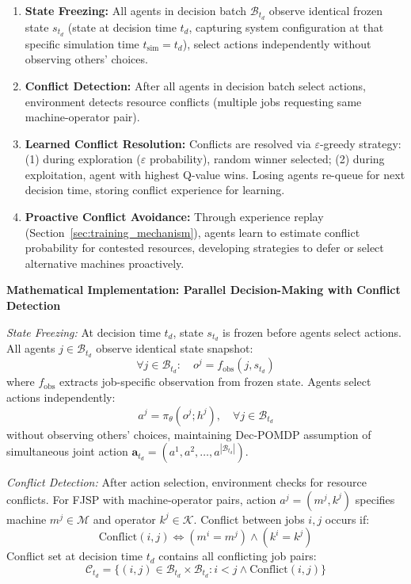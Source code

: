 \begin{enumerate}
\item \textbf{State Freezing:} All agents in decision batch \( \mathcal{B}_{t_d} \) observe identical frozen state \( s_{t_d} \) (state at decision time \( t_d \), capturing system configuration at that specific simulation time \( t_{\text{sim}} = t_d \)), select actions independently without observing others' choices.

\item \textbf{Conflict Detection:} After all agents in decision batch select actions, environment detects resource conflicts (multiple jobs requesting same machine-operator pair).

\item \textbf{Learned Conflict Resolution:} Conflicts are resolved via \( \varepsilon \)-greedy strategy: (1) during exploration (\( \varepsilon \) probability), random winner selected; (2) during exploitation, agent with highest Q-value wins. Losing agents re-queue for next decision time, storing conflict experience for learning.

\item \textbf{Proactive Conflict Avoidance:} Through experience replay (Section~\ref{sec:training_mechanism}), agents learn to estimate conflict probability for contested resources, developing strategies to defer or select alternative machines proactively.
\end{enumerate}

\textbf{Mathematical Implementation: Parallel Decision-Making with Conflict Detection}

\textit{State Freezing:} At decision time \( t_d \), state \( s_{t_d} \) is frozen before agents select actions. All agents \( j \in \mathcal{B}_{t_d} \) observe identical state snapshot:
\[
\forall j \in \mathcal{B}_{t_d}: \quad o^j = f_{\text{obs}}(j, s_{t_d})
\]
where \( f_{\text{obs}} \) extracts job-specific observation from frozen state. Agents select actions independently:
\[
a^j = \pi_{\theta}(o^j; h^j), \quad \forall j \in \mathcal{B}_{t_d}
\]
without observing others' choices, maintaining Dec-POMDP assumption of simultaneous joint action \( \mathbf{a}_{t_d} = (a^1, a^2, \ldots, a^{|\mathcal{B}_{t_d}|}) \).

\textit{Conflict Detection:} After action selection, environment checks for resource conflicts. For FJSP with machine-operator pairs, action \( a^j = (m^j, k^j) \) specifies machine \( m^j \in \mathcal{M} \) and operator \( k^j \in \mathcal{K} \). Conflict between jobs \( i, j \) occurs if:
\[
\text{Conflict}(i, j) \iff (m^i = m^j) \land (k^i = k^j)
\]
Conflict set at decision time \( t_d \) contains all conflicting job pairs:
\[
\mathcal{C}_{t_d} = \{(i, j) \in \mathcal{B}_{t_d} \times \mathcal{B}_{t_d} : i < j \land \text{Conflict}(i, j)\}
\]

